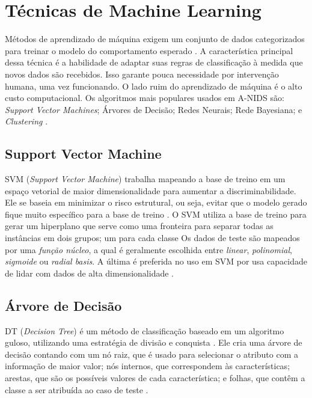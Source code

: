 \section{Técnicas de Machine Learning}
 Métodos de aprendizado de máquina exigem um conjunto de dados categorizados para treinar o modelo do comportamento
 esperado \cite{catania12}. A característica principal dessa técnica é a habilidade de adaptar suas regras de classificação à medida que
 novos dados são recebidos. Isso garante pouca necessidade por intervenção humana, uma vez funcionando. O lado ruim
 do aprendizado de máquina é o alto custo computacional. Os algoritmos mais populares usados em A-NIDS são:
\emph{Support Vector Machines}; Árvores de Decisão; Redes Neurais; Rede Bayesiana; e \emph{Clustering} \cite{tsai09}.

    \subsection{Support Vector Machine}
    SVM (\emph{Support Vector Machine}) trabalha mapeando a base de treino em um espaço vetorial de maior dimensionalidade para aumentar a discriminabilidade.
    Ele se baseia em minimizar o risco estrutural, ou seja, evitar que o modelo gerado fique muito específico para a base de treino \cite{lin12}.
    O SVM utiliza a base de treino para gerar um hiperplano que serve como uma fronteira para separar todas as instâncias em dois grupos; um para cada classe
    Os dados de teste são mapeados por uma \textit{função núcleo}, a qual é geralmente escolhida entre \textit{linear},
    \textit{polinomial}, \textit{sigmoide} ou \textit{radial basis}. A última é preferida no uso em SVM por usa capacidade de lidar com dados de alta dimensionalidade \cite{lin12}.

    \subsection{Árvore de Decisão}
    DT (\emph{Decision Tree}) é um método de classificação baseado em um algoritmo guloso, utilizando uma estratégia de divisão e conquista \cite{lin12}. Ele
    cria uma árvore de decisão contando com um nó raiz, que é usado para selecionar o atributo com a informação de maior valor;
    nós internos, que correspondem às características; arestas, que são os possíveis valores de cada característica; e
    folhas, que contêm a classe a ser atribuída ao caso de teste \cite{benferhat05}.

